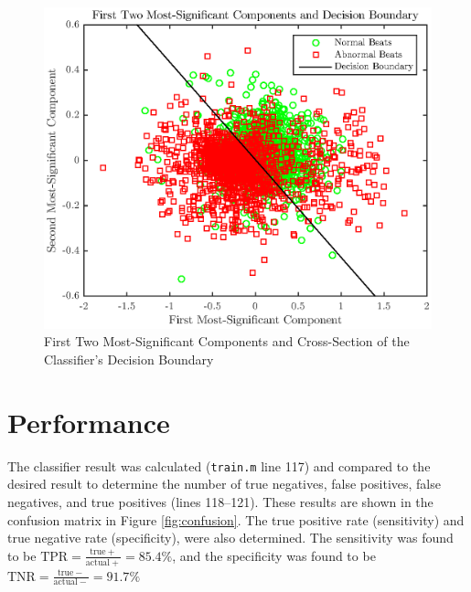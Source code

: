 \documentclass[titlepage,12pt,letter]{article}
\begin{document}
\begin{figure}[hbtp]
    \centering
    \includegraphics[height=0.42\textheight]{../figures/train_05}
    \caption{First Two Most-Significant Components and Cross-Section of the
    Classifier's Decision Boundary}
    \label{fig:classifier}
\end{figure}

\section{Performance} 
The classifier result was calculated (\verb`train.m` line 117) and compared to
the desired result to determine the number of true negatives, false positives,
false negatives, and true positives (lines 118--121).  These results are shown
in the confusion matrix in Figure \ref{fig:confusion}. The true positive rate
(sensitivity) and true negative rate (specificity), were also determined.  The
sensitivity was found to be $\mathrm{TPR} = \frac{\mathrm{true}
+}{\mathrm{actual} +} = 85.4\%$, and the specificity was found to be
$\mathrm{TNR} = \frac{\mathrm{true} -}{\mathrm{actual} -} = 91.7\%$
\end{document}
